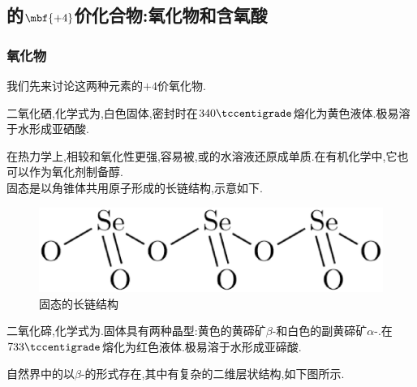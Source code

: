 \documentclass{ctexart}
\begin{document}
\subsection{的$\mbf{+4}$价化合物:氧化物和含氧酸}
\subsubsection{氧化物}我们先来讨论这两种元素的$+4$价氧化物.
\begin{substance}[\ce{SeO2}]
    二氧化硒,化学式为,白色固体,密封时在$340\tccentigrade$熔化为黄色液体.极易溶于水形成亚硒酸.
\end{substance}
在热力学上,相较和氧化性更强,容易被,或的水溶液还原成单质.在有机化学中,它也可以作为氧化剂制备醇.\\
\indent 固态是以角锥体共用原子形成的长链结构,示意如下.
\begin{figure}[H]
    \centering\includegraphics[scale=0.25]{picture/SeO2.eps}
    \caption{固态的长链结构}
\end{figure}
\begin{substance}[\ce{TeO2}]
    二氧化碲,化学式为.固体具有两种晶型:黄色的黄碲矿$\beta$-和白色的副黄碲矿$\alpha$-.在$733\tccentigrade$熔化为红色液体.极易溶于水形成亚碲酸.
\end{substance}
自然界中的以$\beta$-的形式存在,其中有复杂的二维层状结构,如下图所示.
\end{document}
